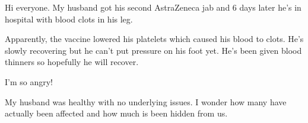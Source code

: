 Hi everyone. My husband got his second AstraZeneca jab and 6 days later he’s in
hospital with blood clots in his leg.

Apparently, the vaccine lowered his platelets which caused his blood to
clots. He’s slowly recovering but he can’t put pressure on his foot yet. He’s
been given blood thinners so hopefully he will recover.

I’m so angry!

My husband was healthy with no underlying issues. I wonder how many have
actually been affected and how much is been hidden from us.

